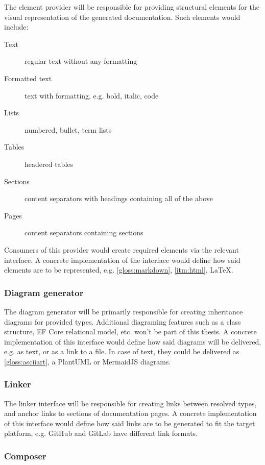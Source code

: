 The element provider will be responsible for providing structural elements for the visual representation of the generated documentation. Such elements would include:
\begin{description}
    \item[Text] regular text without any formatting
    \item[Formatted text] text with formatting, e.g. bold, italic, code
    \item[Lists] numbered, bullet, term lists
    \item[Tables] headered tables
    \item[Sections] content separators with headings containing all of the above
    \item[Pages] content separators containing sections
\end{description}

Consumers of this provider would create required elements via the relevant interface.
A concrete implementation of the interface would define how said elements are to be represented, e.g. \ref{gloss:markdown}, \ref{itm:html}, \LaTeX.

\subsubsection{Diagram generator}

The diagram generator will be primarily responsible for creating inheritance diagrams for provided types. Additional diagraming features such as a class structure, EF Core relational model, etc. won't be part of this thesis.
A concrete implementation of this interface would define how said diagrams will be delivered, e.g. as text, or as a link to a file.
In case of text, they could be delivered as \ref{gloss:asciiart}, a PlantUML or MermaidJS diagrams.

\subsubsection{Linker}

The linker interface will be responsible for creating links between resolved types, and anchor links to sections of documentation pages.
A concrete implementation of this interface would define how said links are to be generated to fit the target platform, e.g. GitHub and GitLab have different link formats.

\subsubsection{Composer} \label{sec:composer}

